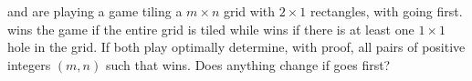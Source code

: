  and  are playing a game tiling a $m \times n$ grid with $2 \times 1$ rectangles, with  going first.  wins the game if the entire grid is tiled while  wins if there is at least one $1 \times 1$ hole in the grid. If both play optimally determine, with proof, all pairs of positive integers $(m, n)$ such that  wins. Does anything change if  goes first?